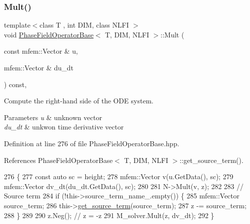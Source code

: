 \subsubsection{\texorpdfstring{Mult()}{Mult()}}
{\footnotesize\ttfamily template$<$class T , int D\+IM, class N\+L\+FI $>$ \\
void \hyperlink{classPhaseFieldOperatorBase}{Phase\+Field\+Operator\+Base}$<$ T, D\+IM, N\+L\+FI $>$\+::Mult (\begin{DoxyParamCaption}\item[{const mfem\+::\+Vector \&}]{u,  }\item[{mfem\+::\+Vector \&}]{du\+\_\+dt }\end{DoxyParamCaption}) const\hspace{0.3cm}{\ttfamily [virtual]}, {\ttfamily [inherited]}}



Compute the right-\/hand side of the O\+DE system. 


\begin{DoxyParams}{Parameters}
{\em u} & unknown vector \\
\hline
{\em du\+\_\+dt} & unkwon time derivative vector \\
\hline
\end{DoxyParams}


Definition at line 276 of file Phase\+Field\+Operator\+Base.\+hpp.



References Phase\+Field\+Operator\+Base$<$ T, D\+I\+M, N\+L\+F\+I $>$\+::get\+\_\+source\+\_\+term().


\begin{DoxyCode}
276                                                                                             \{
277   \textcolor{keyword}{const} \textcolor{keyword}{auto} sc = height;
278   mfem::Vector v(u.GetData(), sc);
279   mfem::Vector dv\_dt(du\_dt.GetData(), sc);
280 
281   N->Mult(v, z);
282 
283   \textcolor{comment}{// Source term}
284   \textcolor{keywordflow}{if} (!this->source\_term\_name\_.empty()) \{
285     mfem::Vector source\_term;
286     this->\hyperlink{classPhaseFieldOperatorBase_ade4aaf43e627fdc8b2a3690839e225d3}{get\_source\_term}(source\_term);
287     z -= source\_term;
288   \}
289 
290   z.Neg();  \textcolor{comment}{// z = -z}
291   M\_solver.Mult(z, dv\_dt);
292 \}
\end{DoxyCode}
\mbox{\label{classPhaseFieldOperator_a794471a8c45b86717f73e63e17d40ff0}} 

